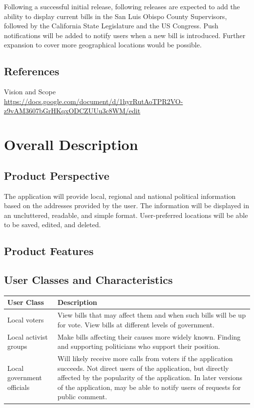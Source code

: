 \documentclass[12pt,oneside,letterpaper]{article}
\newcounter{use_case}
\begin{document}
Following a successful initial release, following releases are
expected to add the ability to display current bills in the San Luis
Obispo County Supervisors, followed by the California State
Legislature and the US Congress. Push notifications will be added to
notify users when a new bill is introduced. Further expansion to
cover more geographical locations would be possible.

\subsection{References}
\begin{compactenum}
\item Vision and Scope\\
  \url{https://docs.google.com/document/d/1hyrRutAoTPR2VO-z9vAM3607bGrHKqxODCZUUu3c8WM/edit}
\end{compactenum}

\section{Overall Description}
\subsection{Product Perspective}
The application will provide local, regional and national political
information based on the addresses provided by the user. The information
will be displayed in an uncluttered, readable, and simple format.
User-preferred locations will be able to be saved, edited, and deleted.

\subsection{Product Features}
\subsection{User Classes and Characteristics}
\begin{longtabu}{|l|X|}
  \hline
  \textbf{User Class}&\textbf{Description}\\
  \hline
  Local voters & View bills that may affect them and when such bills will be up for vote. View bills at different levels of government.\\
  \hline
  Local activist groups & Make bills affecting their causes more widely known. Finding and supporting politicians who support their position.\\
  \hline
  Local government officials & Will likely receive more calls from voters if the application succeeds. Not direct users of the application, but directly affected by the popularity of the application. In later versions of the application, may be able to notify users of requests for public comment.\\
  \hline
\end{longtabu}
\end{document}
